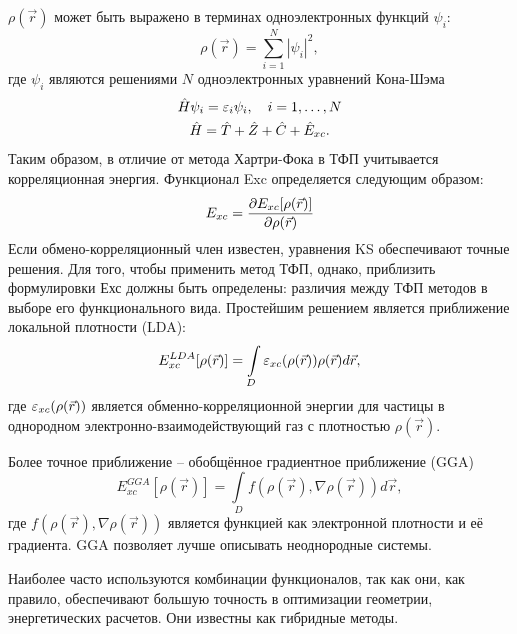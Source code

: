 \( \rho(\vec{r}) \)  может быть выражено в терминах одноэлектронных функций \( \psi_i \):
\begin{equation}
    \rho(\vec{r}) = \sum_{i=1}^N |\psi_i|^2,
\end{equation}
где \(\psi_i\) являются решениями \( N \) одноэлектронных уравнений Кона-Шэма
\begin{gather}
    \hat{H}\psi_i = \varepsilon_i\psi_i,\quad i=1,\ldots,N\\
    \hat{H} = \hat{T} + \hat{Z} + \hat{C} + \hat{E}_{xc}.
\end{gather}
Таким образом, в отличие от метода Хартри-Фока в ТФП учитывается корреляционная энергия. Функционал Exc определяется следующим образом:
\begin{equation}
    E_{xc} = \frac{\partial E_{xc}[\rho(\vec{r})]}{\partial \rho(\vec{r})}
\end{equation}
Если обмено-корреляционный член известен, уравнения KS обеспечивают точные решения. Для того, чтобы применить метод ТФП, однако, приблизить формулировки Ехс должны быть определены: различия между ТФП методов в выборе его функционального вида. Простейшим решением является приближение локальной плотности (LDA):
\begin{equation}
    E_{xc}^{LDA}[\rho(\vec{r})] = \int\limits_{D}\varepsilon_{xc}(\rho(\vec{r}))\rho(\vec{r}) d\vec{r},
\end{equation}
где \(\varepsilon_{xc}(\rho(\vec{r}))\) является обменно-корреляционной энергии для частицы в однородном электронно-взаимодействующий газ с плотностью \(\rho(\vec{r})\).

Более точное приближение -- обобщённое градиентное приближение (GGA)
\begin{equation}
    E_{xc}^{GGA}[\rho(\vec{r})] = \int\limits_{D}f(\rho(\vec{r}), \nabla\rho(\vec{r})) d\vec{r},
\end{equation}
где \( f(\rho(\vec{r}), \nabla\rho(\vec{r})) \) является функцией как электронной плотности и её градиента. GGA позволяет лучше описывать неоднородные системы.

Наиболее часто используются комбинации функционалов, так как они, как правило, обеспечивают большую точность в оптимизации геометрии, энергетических расчетов. Они известны как гибридные методы.